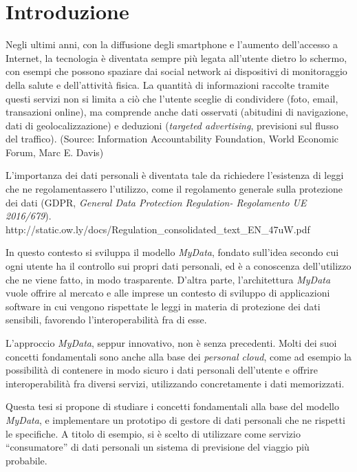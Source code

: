 \chapter{Introduzione}
\label{Introduzione}
\thispagestyle{empty}

\noindent Negli ultimi anni, con la diffusione degli smartphone e l’aumento dell’accesso a Internet, la tecnologia \`e diventata sempre pi\`u legata all’utente dietro lo schermo, con esempi che possono spaziare dai social network ai dispositivi di monitoraggio della salute e dell’attivit\`a fisica. La quantit\`a di informazioni raccolte tramite questi servizi non si limita a ciò che l’utente sceglie di condividere (foto, email, transazioni online), ma comprende anche dati osservati (abitudini di navigazione, dati di geolocalizzazione) e deduzioni (\textit{targeted advertising}, previsioni sul flusso del traffico). (Source: Information Accountability Foundation, World Economic Forum, Marc E. Davis)

L’importanza dei dati personali \`e diventata tale da richiedere l’esistenza di leggi che ne regolamentassero l’utilizzo, come il regolamento generale sulla protezione dei dati (GDPR, \textit{General Data Protection Regulation- Regolamento UE 2016/679}). http://static.ow.ly/docs/Regulation\_consolidated\_text\_EN\_47uW.pdf 

In questo contesto si sviluppa il modello \textit{MyData}, fondato sull’idea secondo cui ogni utente ha il controllo sui propri dati personali, ed \`e a conoscenza dell’utilizzo che ne viene fatto, in modo trasparente. D’altra parte, l’architettura \textit{MyData} vuole offrire al mercato e alle imprese un contesto di sviluppo di applicazioni software in cui vengono rispettate le leggi in materia di protezione dei dati sensibili, favorendo l’interoperabilit\`a fra di esse.

L’approccio \textit{MyData}, seppur innovativo, non \`e senza precedenti. Molti dei suoi concetti fondamentali sono anche alla base dei \textit{personal cloud}, come ad esempio la possibilit\`a di contenere in modo sicuro i dati personali dell’utente e offrire interoperabilit\`a fra diversi servizi, utilizzando concretamente i dati memorizzati.

Questa tesi si propone di studiare i concetti fondamentali alla base del modello \textit{MyData}, e implementare un prototipo di gestore di dati personali che ne rispetti le specifiche.
A titolo di esempio, si \`e scelto di utilizzare come servizio “consumatore” di dati personali un sistema di previsione del viaggio pi\`u probabile.

